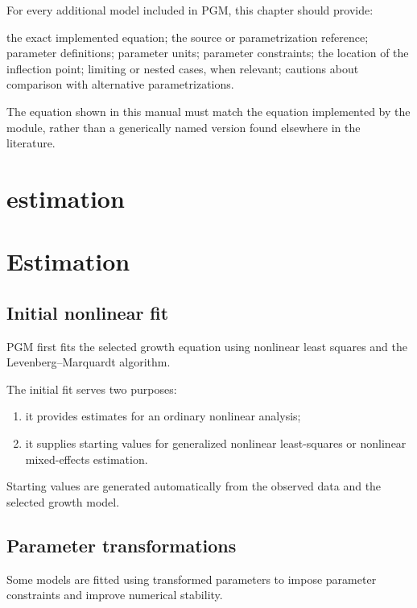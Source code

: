 \documentclass[
  english,
  letterpaper,
  DIV=11,
  numbers=noendperiod]{scrreprt}
\providecommand{\tightlist}{%
  \setlength{\itemsep}{0pt}\setlength{\parskip}{0pt}}
\begin{document}
For every additional model included in PGM, this chapter should provide:

the exact implemented equation; the source or parametrization reference;
parameter definitions; parameter units; parameter constraints; the
location of the inflection point; limiting or nested cases, when
relevant; cautions about comparison with alternative parametrizations.

The equation shown in this manual must match the equation implemented by
the module, rather than a generically named version found elsewhere in
the literature.

\chapter{estimation}\label{estimation}

\chapter{Estimation}\label{estimation-1}

\section{Initial nonlinear fit}\label{initial-nonlinear-fit}

PGM first fits the selected growth equation using nonlinear least
squares and the Levenberg--Marquardt algorithm.

The initial fit serves two purposes:

\begin{enumerate}
\def\labelenumi{\arabic{enumi}.}
\tightlist
\item
  it provides estimates for an ordinary nonlinear analysis;
\item
  it supplies starting values for generalized nonlinear least-squares or
  nonlinear mixed-effects estimation.
\end{enumerate}

Starting values are generated automatically from the observed data and
the selected growth model.

\section{Parameter transformations}\label{parameter-transformations}

Some models are fitted using transformed parameters to impose parameter
constraints and improve numerical stability.
\end{document}

